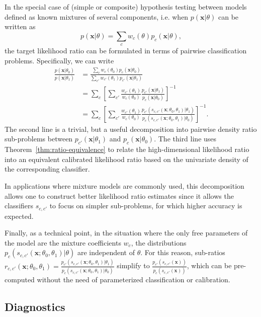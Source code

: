 \documentclass[12pt]{article}
\numberwithin{equation}{section}
\theoremstyle{plain}
\begin{document}
In the special case of (simple or composite) hypothesis testing between
models defined as known mixtures of several components, i.e. when $p(\mathbf{x}|\theta)$ can be written as
\begin{equation}
p(\mathbf{x}|\theta)=\sum_c w_c(\theta) p_c(\mathbf{x}| \theta),
\end{equation}
the target likelihood ratio can be formulated in terms of pairwise
classification problems. Specifically, we can write
\begin{align}
\frac{p(\mathbf{x}|\theta_0)}{p(\mathbf{x}|\theta_1)} &= \frac{\sum_c w_c(\theta_0) p_c(\mathbf{x}| \theta_0)}{\sum_{c'} w_{c'}(\theta_1) p_{c'}(\mathbf{x}| \theta_1)} \nonumber \\
&= \sum_c \left[ \sum_{c'} \frac{ w_{c'}(\theta_1)}{w_c(\theta_0)} \frac{ p_{c'}(\mathbf{x}| \theta_1)}{  p_c(\mathbf{x}| \theta_0)}  \right]^{-1} \nonumber \\
&= \sum_c \left[ \sum_{c'} \frac{ w_{c'}(\theta_1)}{w_c(\theta_0)} \frac{ p_{c'}(s_{c,c'}(\mathbf{x};\theta_0, \theta_1)| \theta_1)}{ p_c(s_{c,c'}(\mathbf{x};\theta_0, \theta_1)| \theta_0)}  \right]^{-1}. \label{eq:decomposedResult}
\end{align}
The second line is a trivial, but a useful decomposition into pairwise
density ratio sub-problems between $p_{c'}(\mathbf{x}|\theta_1)$ and
$p_c(\mathbf{x}|\theta_0)$.  The third line uses
Theorem~\ref{thm:ratio-equivalence} to relate the high-dimensional likelihood
ratio into an equivalent calibrated likelihood ratio based on the univariate
density of the corresponding classifier.

In applications where mixture models are commonly used, this decomposition allows
one to construct better likelihood ratio estimates since it allows the classifiers
$s_{c,c'}$ to focus on simpler sub-problems, for which higher accuracy is
expected.

Finally, as a technical point, in the situation where the only free parameters
of the  model are the mixture coefficients $w_c$, the distributions
$p_{c}(s_{c,c'}(\mathbf{x};\theta_0, \theta_1)| \theta)$ are independent of
$\theta$. For this reason, sub-ratios $r_{c, c'}(\mathbf{x}; \theta_0, \theta_1) = \frac{
p_{c'}(s_{c,c'}(\mathbf{x};\theta_0, \theta_1)|\theta_1)}{
p_c(s_{c,c'}(\mathbf{x};\theta_0, \theta_1)|\theta_0)}$ simplify to $\frac{
p_{c'}(s_{c,c'}(\mathbf{x}))}{ p_c(s_{c,c'}(\mathbf{x}))}$, which can be
pre-computed without the need of parameterized classification or
calibration.

\subsection{Diagnostics}
\end{document}

